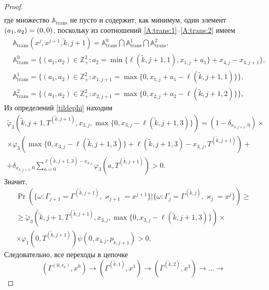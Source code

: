 \begin{proof}
\begin{multline*}
\end{multline*}
где множество ${\mathbb A}_{\mathrm{trans}}$ не пусто и содержит,  как минимум,  один элемент $(a_1,  a_2)\hm=(0,  0)$,  поскольку из соотношений \eqref{A:trans:1}--\eqref{A:trans:2} имеем
\begin{align*}
&{\mathbb A}_{\mathrm{trans}}(x^j,  x^{j+1},  \tilde{k},  j+1) = {\mathbb A}_{\mathrm{trans}}^0 \bigcap {\mathbb A}_{\mathrm{trans}}^1\bigcap {\mathbb A}_{\mathrm{trans}}^2, \\
&{\mathbb A}_{\mathrm{trans}}^0 = \{(a_1,  a_2) \in \mathbb{Z}_+^2 \colon a_2 = \min{\{\ell(\tilde{k},  j+1,  1),  x_{1,  j}+a_1}\} +x_{4,  j}- x_{4,  j+1}\}, \\
&{\mathbb A}_{\mathrm{trans}}^1 = \{(a_1,  a_2) \in \mathbb{Z}_+^2 \colon x_{1,  j+1}=\max{\{0, x_{1,  j}+a_1-\ell(\tilde{k},  j+1, 1)\}}\}, \\
 &{\mathbb A}_{\mathrm{trans}}^2 = \{(a_1,  a_2) \in \mathbb{Z}_+^2 \colon  x_{2,  j+1} =\max{\{0,  x_{2,  j}+a_2-\ell(\tilde{k},  j+1, 2)\}}\}, 
\end{align*}
Из определений \eqref{tildephi} находим
\begin{multline*}
\widetilde{\varphi}_3(\tilde{k},  j+1,  T^{(\tilde{k},  j+1)},  x_{3,  j},  \max{\{0,  x_{3,  j} - \ell(\tilde{k},  j+1,  3)\}})= (1-\delta_{x_{3,  j+1},  0}) \times \\\times\varphi_3(\max{\{0,  x_{3,  j} - \ell(\tilde{k},  j+1,  3)\}} + \ell (\tilde{k},  j+1,  3) - x_{3,  j}, T^{(\tilde{k},  j+1)} ) 
+\\+\delta_{x_{3,  j+1},  0} \sum_{a=0}^{\ell(\tilde{k},  j+1,  3)-x_{3,  j}}\varphi_3 (a,  T^{(\tilde{k},  j+1)})>0.
\end{multline*}
Значит, 
\begin{multline*}
\Pr(\{\omega\colon \Gamma_{j+1}=\Gamma^{(\tilde{k},  j+1)},  \varkappa_{j+1}=x^{j+1}\}|\{\omega\colon 
\Gamma_{j}=\Gamma^{(\tilde{k},  j)},  \varkappa_{j}=x^j\})\geqslant \\
\geqslant \widetilde{\varphi}_3(\tilde{k},  j+1,  T^{(\tilde{k},  j+1)},  x_{3, j},  \max{\{0,  x_{3,  j} - \ell(\tilde{k},  j+1,  3)\}})
\times \\ \times
\varphi_1(0,  T^{(\tilde{k},  j+1)})  \psi(0,  x_{4,  j},  p_{\tilde{k},  j+1}) > 0. 
\end{multline*}
Следовательно,  все переходы в цепочке
\begin{equation*}
(\Gamma^{(0, r_0)}, x^0) \rightarrow (\Gamma^{(\tilde{k}, 1)}, x^1) \rightarrow (\Gamma^{(\tilde{k}, 2)}, x^1) \rightarrow \ldots  \rightarrow

\end{equation*}
\end{proof}
